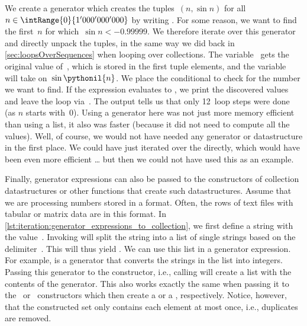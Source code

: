 We create a generator  which creates the tuples~$(n,\sin{n})$ for all~$n\in\intRange{0}{1'000'000'000}$ by writing .
For some reason, we want to find the first~$n$ for which~$\sin{n} < -0.99999$.
We therefore iterate over this generator~ and directly unpack the tuples, in the same way we did back in \cref{sec:loopsOverSequences} when looping over collections.
The variable~ gets the original value of~, which is stored in the first tuple elements, and the variable~ will take on~$\sin{\pythonil{n}}$.
We place the conditional  to check for the number we want to find.
If the expression  evaluates to , we print the discovered values and leave the loop via~.
The output  tells us that only 12~loop steps were done (as $n$ starts with~0).
Using a generator here was not just more memory efficient than using a list, it also was faster (because it did not need to compute all the values).
Well, of course, we would not have needed any generator or datastructure in the first place.
We could have just iterated over the  directly, which would have been even more efficient {\dots} but then we could not have used this as an example.%
%
%
%
%
\begin{sloppypar}%
Finally, generator expressions can also be passed to the constructors of collection datastructures or other functions that create such datastructures.
Assume that we are processing numbers stored in a  format.
Often, the rows of text files with tabular or matrix data are in this format.
In \cref{lst:iteration:generator_expressions_to_collection}, we first define a string  with the value~.
Invoking  will split the string into a list of single strings based on the delimiter~.
This will thus yield \pythonil{["22", "56", "33", "67", "43", "33", "12"]}.
We can use this list in a generator expression.
For example,  is a generator that converts the strings in the list into integers.
Passing this generator to the  constructor, i.e., calling  will create a list with the contents of the generator.
This also works exactly the same when passing it to the~ or~ constructors which then create a  or a , respectively.
Notice, however, that the constructed set only contains each element at most once, i.e., duplicates are removed.%
\end{sloppypar}%
